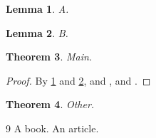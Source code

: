 \documentclass{article}
\newtheorem{theorem}{Theorem}
\newtheorem{lemma}[theorem]{Lemma}
\begin{document}
\begin{lemma}\label{lem:a}A.\end{lemma}
\begin{lemma}\label{lem:b}B.\end{lemma}
\begin{theorem}\label{thm:m}Main.\end{theorem}
\begin{proof}
  By \ref{lem:a} and \ref{lem:b}, \cite{bk} and \cite[Thm~3]{bk},
  and \cite{art}.
\end{proof}

\begin{theorem}\label{thm:n}Other.\end{theorem}


\begin{thebibliography}{9}
A book.
An article.
\end{thebibliography}
\end{document}

